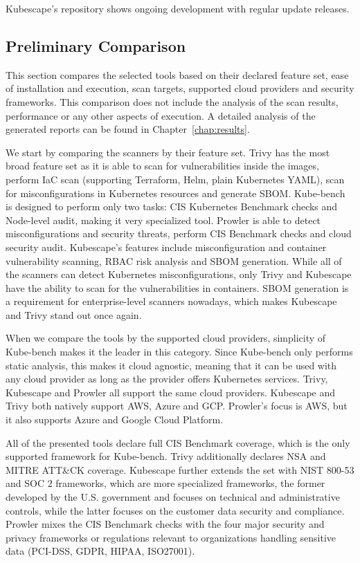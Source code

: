 Kubescape's repository shows ongoing development with regular update releases.

\subsection{Preliminary Comparison}

This section compares the selected tools based on their declared feature set, ease of installation and execution, scan targets, supported cloud providers and security frameworks. This comparison does not include the analysis of the scan results, performance or any other aspects of execution. A detailed analysis of the generated reports can be found in Chapter~\ref{chap:results}.

We start by comparing the scanners by their feature set. Trivy has the most broad feature set as it is able to scan for vulnerabilities inside the images, perform IaC scan (supporting Terraform, Helm, plain Kubernetes YAML), scan for misconfigurations in Kubernetes resources and generate SBOM. Kube-bench is designed to perform only two tasks: CIS Kubernetes Benchmark checks and Node-level audit, making it very specialized tool. Prowler is able to detect misconfigurations and security threats, perform CIS Benchmark checks and cloud security audit. Kubescape's features include misconfiguration and container vulnerability scanning, RBAC risk analysis and SBOM generation. While all of the scanners can detect Kubernetes misconfigurations, only Trivy and Kubescape have the ability to scan for the vulnerabilities in containers. SBOM generation is a requirement for enterprise-level scanners nowadays, which makes Kubescape and Trivy stand out once again.

When we compare the tools by the supported cloud providers, simplicity of Kube-bench makes it the leader in this category. Since Kube-bench only performs static analysis, this makes it cloud agnostic, meaning that it can be used with any cloud provider as long as the provider offers Kubernetes services. Trivy, Kubescape and Prowler all support the same cloud providers. Kubescape and Trivy both natively support AWS, Azure and GCP. Prowler's focus is AWS, but it also supports Azure and Google Cloud Platform.

All of the presented tools declare full CIS Benchmark coverage, which is the only supported framework for Kube-bench. Trivy additionally declares NSA and MITRE ATT\&CK coverage. Kubescape further extends the set with NIST 800-53 and SOC 2 frameworks, which are more specialized frameworks, the former developed by the U.S. government and focuses on technical and administrative controls, while the latter focuses on the customer data security and compliance. Prowler mixes the CIS Benchmark checks with the four major security and privacy frameworks or regulations relevant to organizations handling sensitive data (PCI-DSS, GDPR, HIPAA, ISO27001).

